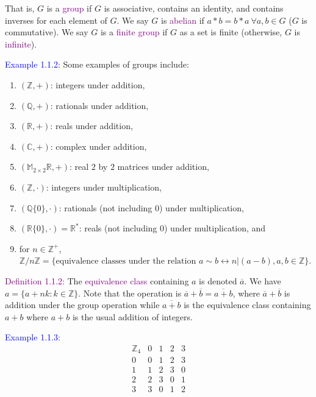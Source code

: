 \documentclass{article}
\begin{document}
That is, $G$ is a \textcolor{purple}{group} if $G$ is associative, contains an identity, and contains inverses for each element of $G$. 
We say $G$ is \textcolor{purple}{abelian} if $a * b = b * a \ \forall a,b \in G$ ($G$ is commutative). We say $G$ is a 
\textcolor{purple}{finite group} if $G$ as a set is finite (otherwise, $G$ is \textcolor{purple}{infinite}).

\textcolor{blue}{Example 1.1.2:} Some examples of groups include:
\begin{enumerate}
    \item $( \mathbb{Z}, +)$: integers under addition,
    \item $(\mathbb{Q}, +)$: rationals under addition,
    \item $(\mathbb{R}, +)$: reals under addition,
    \item $(\mathbb{C}, +)$: complex under addition,
    \item $(\mathbb{M}_{2 \times 2}\mathbb{R}, +)$: real $2$ by $2$ matrices under addition,
    \item $(\mathbb{Z}, \cdot)$: integers under multiplication,
    \item $(\mathbb{Q}\{0\}, \cdot)$: rationals (not including $0$) under multiplication,
    \item $(\mathbb{R}\{0\}, \cdot)=\mathbb{R}^*$: reals (not including $0$) under multiplication, and 
    \item for $n \in \mathbb{Z}^+$, $\mathbb{Z} / n\mathbb{Z} = \{\text{equivalence classes under the relation }a \sim b \longleftrightarrow n|(a-b),a,b \in \mathbb{Z}\}$.
\end{enumerate}

\textcolor{purple}{Definition 1.1.2:} The \textcolor{purple}{equivalence class} containing $a$ is denoted $\overline{a}$. We have 
$a = \{a+nk: k \in \mathbb{Z}\}$. Note that the operation is $\overline{a}+\overline{b}=\overline{a+b}$, where $\overline{a}+\overline{b}$ 
is addition under the group operation while $\overline{a+b}$ is the equivalence class containing $a+b$ where $a+b$ is the usual addition 
of integers.

\textcolor{blue}{Example 1.1.3:} \[
\begin{array}{c|cccc}
    \mathbb{Z}_4 & 0 & 1 & 2 & 3 \\ \hline
    0 & 0 & 1 & 2 & 3 \\
    1 & 1 & 2 & 3 & 0 \\
    2 & 2 & 3 & 0 & 1 \\
    3 & 3 & 0 & 1 & 2 \\
\end{array}
\]
\end{document}
